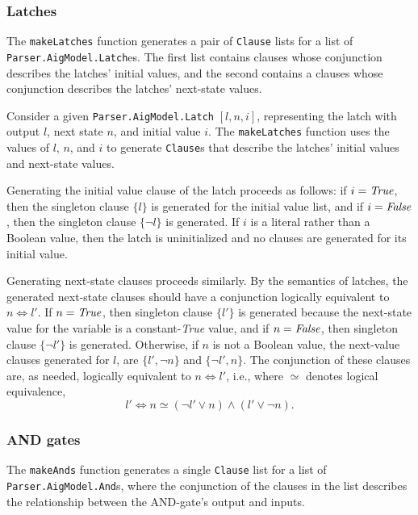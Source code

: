 \documentclass[12pt,a4paper,twoside,openright]{report}
\begin{document}
{{\subsubsection{Latches}
The \verb,makeLatches, function generates a pair of \verb,Clause, lists
for a list of \verb,Parser.AigModel.Latch,es. The first list contains
clauses whose conjunction describes the latches' initial values,
and the second contains a clauses whose conjunction describes the
latches' next-state values.

Consider a given \verb,Parser.AigModel.Latch, $[l, n, i]$, representing the latch with
output $l$, next state $n$, %
and initial value $i$.
The \verb,makeLatches, function uses the
values of $l$, $n$, and $i$ to generate \verb,Clause,s that describe the latches' initial values and
next-state values.

Generating the initial value clause of the latch proceeds as follows: if $i = {\it True}$,
then the singleton clause $\{l\}$ is generated for the initial value list, and if $i = {\it False}$,
then the singleton clause $\{\neg l\}$ is generated.
If $i$ is a literal rather than a Boolean value, then the latch is
uninitialized and no clauses are generated for its initial value.

Generating next-state clauses proceeds similarly.
By the semantics of latches, the generated next-state clauses should have
a conjunction logically equivalent to $n \Leftrightarrow l'$.
If $n = {\it True}$, then singleton clause
$\{l'\}$ is generated because the next-state value for the variable is a constant-{\it True} value,
and if $n = {\it False}$, then singleton clause $\{\neg l'\}$ is generated.
Otherwise, if $n$ is not a Boolean value,
the next-value clauses generated for $l$, are $\{l', \neg n\}$
and $\{\neg l', n\}$. The conjunction of these clauses are, as needed, logically equivalent
to $n \Leftrightarrow l'$, i.e., where $\simeq$ denotes logical equivalence,
$$l' \Leftrightarrow n \simeq (\neg l' \vee n) \wedge (l' \vee \neg n).$$

\subsubsection{AND gates}
The \verb,makeAnds, function generates a single \verb,Clause, list for a list of \verb,Parser.AigModel.And,s,
where the conjunction of the clauses in the list describes the relationship between the AND-gate's output
and inputs.

}}
\end{document}
